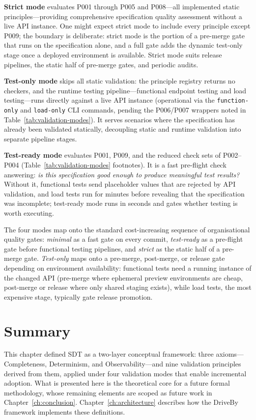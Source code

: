 \textbf{Strict mode} evaluates P001 through P005 and P008---all implemented static principles---providing comprehensive specification quality assessment without a live API instance. One might expect strict mode to include every principle except P009; the boundary is deliberate: strict mode is the portion of a pre-merge gate that runs on the specification alone, and a full gate adds the dynamic test-only stage once a deployed environment is available. Strict mode suits release pipelines, the static half of pre-merge gates, and periodic audits.

\textbf{Test-only mode} skips all static validation: the principle registry returns no checkers, and the runtime testing pipeline---functional endpoint testing and load testing---runs directly against a live API instance (operational via the \texttt{function-only} and \texttt{load-only} CLI commands, pending the P006/P007 wrappers noted in Table~\ref{tab:validation-modes}). It serves scenarios where the specification has already been validated statically, decoupling static and runtime validation into separate pipeline stages.

\textbf{Test-ready mode} evaluates P001, P009, and the reduced check sets of P002--P004 (Table~\ref{tab:validation-modes} footnotes). It is a fast pre-flight check answering: \textit{is this specification good enough to produce meaningful test results?} Without it, functional tests send placeholder values that are rejected by API validation, and load tests run for minutes before revealing that the specification was incomplete; test-ready mode runs in seconds and gates whether testing is worth executing.

The four modes map onto the standard cost-increasing sequence of organisational quality gates: \textit{minimal} as a fast gate on every commit, \textit{test-ready} as a pre-flight gate before functional testing pipelines, and \textit{strict} as the static half of a pre-merge gate. \textit{Test-only} maps onto a pre-merge, post-merge, or release gate depending on environment availability: functional tests need a running instance of the changed API (pre-merge where ephemeral preview environments are cheap, post-merge or release where only shared staging exists), while load tests, the most expensive stage, typically gate release promotion.

\section{Summary}
\label{sec:methodology-summary}

This chapter defined SDT as a two-layer conceptual framework: three axioms---Completeness, Determinism, and Observability---and nine validation principles derived from them, applied under four validation modes that enable incremental adoption. What is presented here is the theoretical core for a future formal methodology, whose remaining elements are scoped as future work in Chapter~\ref{ch:conclusion}. Chapter~\ref{ch:architecture} describes how the DriveBy framework implements these definitions.
